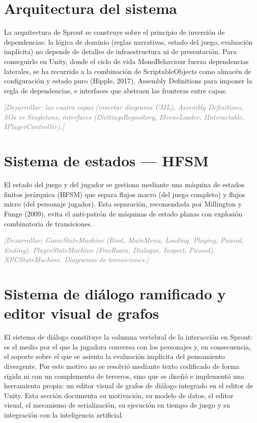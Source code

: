 \documentclass[12pt,twoside,titlepage]{report}
\begin{document}
\section{Arquitectura del sistema}

La arquitectura de Sprout se construye sobre el principio de inversión de dependencias: la lógica de dominio (reglas narrativas, estado del juego, evaluación implícita) no depende de detalles de infraestructura ni de presentación. Para conseguirlo en Unity, donde el ciclo de vida MonoBehaviour fuerza dependencias laterales, se ha recurrido a la combinación de ScriptableObjects como almacén de configuración y estado puro (Hipple, 2017), Assembly Definitions para imponer la regla de dependencias, e interfaces que abstraen las fronteras entre capas.

\textcolor{gray}{\textit{[Desarrollar: las cuatro capas (insertar diagrama UML), Assembly Definitions, SOs vs Singletons, interfaces (ISettingsRepository, ISceneLoader, IInteractable, IPlayerController).]}}

\section{Sistema de estados --- HFSM}

El estado del juego y del jugador se gestiona mediante una máquina de estados finitos jerárquica (HFSM) que separa flujos macro (del juego completo) y flujos micro (del personaje jugador). Esta separación, recomendada por Millington y Funge (2009), evita el anti-patrón de máquinas de estado planas con explosión combinatoria de transiciones.

\textcolor{gray}{\textit{[Desarrollar: GameStateMachine (Boot, MainMenu, Loading, Playing, Paused, Ending), PlayerStateMachine (FreeRoam, Dialogue, Inspect, Paused), NPCStateMachine. Diagramas de transiciones.]}}

\section{Sistema de diálogo ramificado y editor visual de grafos}

El sistema de diálogo constituye la columna vertebral de la interacción en Sprout: es el medio por el que la jugadora conversa con los personajes y, en consecuencia, el soporte sobre el que se asienta la evaluación implícita del pensamiento divergente. Por este motivo no se resolvió mediante texto codificado de forma rígida ni con un complemento de terceros, sino que se diseñó e implementó una herramienta propia: un editor visual de grafos de diálogo integrado en el editor de Unity. Esta sección documenta su motivación, su modelo de datos, el editor visual, el mecanismo de serialización, su ejecución en tiempo de juego y su integración con la inteligencia artificial.
\end{document}
